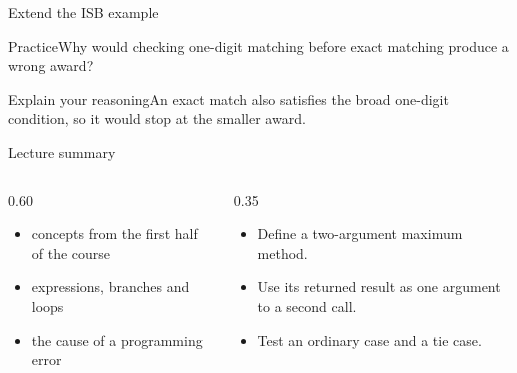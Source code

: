 \documentclass[10pt,aspectratio=169]{beamer}
\begin{document}
\begin{frame}[fragile,t]{Extend the ISB example}
\begin{alertblock}{Practice}Why would checking one{-}digit matching before exact matching produce a wrong award?\end{alertblock}\vspace{3mm}\begin{exampleblock}{Explain your reasoning}An exact match also satisfies the broad one{-}digit condition, so it would stop at the smaller award.\end{exampleblock}
\end{frame}
\begin{frame}[fragile,t]{Lecture summary}
\begin{columns}[T,onlytextwidth]\begin{column}{0.60\textwidth}
\begin{itemize}
\item concepts from the first half of the course
\item expressions, branches and loops
\item the cause of a programming error
\end{itemize}
\end{column}\begin{column}{0.35\textwidth}\small
\begin{itemize}
\item Define a two-argument maximum method.
\item Use its returned result as one argument to a second call.
\item Test an ordinary case and a tie case.
\end{itemize}
\end{column}\end{columns}
\end{frame}
\end{document}

